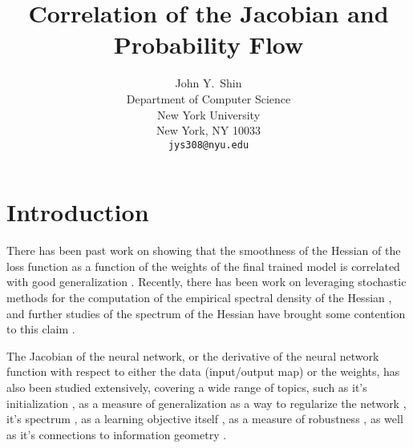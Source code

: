 \documentclass{article}
\title{Correlation of the Jacobian and Probability Flow}
\author{%
  John Y.~Shin \\
  Department of Computer Science\\
  New York University\\
  New York, NY 10033 \\
  \texttt{jys308@nyu.edu} \\
}
\begin{document}
\maketitle

\begin{abstract}
\end{abstract}

\section{Introduction}

There has been past work on showing that the smoothness of the Hessian of the loss function as a function of the weights of the final trained model is correlated with good generalization \cite{sagun2017empirical, chaudhari2019entropy}. Recently, there has been work on leveraging stochastic methods for the computation of the empirical spectral density of the Hessian \cite{ghorbani2019investigation, yao2019pyhessian}, and further studies of the spectrum of the Hessian have brought some contention to this claim \cite{goldblum2019truth, maddox2020rethinking, granziol2020flatness}. 

\cite{ghorbani2019investigation, goldblum2019truth, maddox2020rethinking, chaudhari2019entropy, sagun2017empirical, granziol2020flatness, yao2019pyhessian}

The Jacobian of the neural network, or the derivative of the neural network function with respect to either the data (input/output map) or the weights, has also been studied extensively, covering a wide range of topics, such as it's initialization \cite{pennington2017resurrecting, pennington2018emergence}, as a measure of generalization \cite{sokolic2017robust, novak2018sensitivity, jiang2018predicting, oymak2019generalization, oymak2019generalization, sanyal2019stable} as a way to regularize the network \cite{bagge2018tangent, hoffman2019robust}, it's spectrum \cite{pennington2017resurrecting, pennington2018emergence, ling2019spectrum, zhang2019one, tarnowski2019dynamical, wang2016analysis}, as a learning objective itself \cite{lorrainejacnet}, as a measure of robustness \cite{yu2018interpreting}, as well as it's connections to information geometry \cite{sokol2018information}.


\cite{sokolic2017robust, pennington2017resurrecting, novak2018sensitivity, pennington2018emergence, bagge2018tangent, ling2019spectrum, jiang2018predicting, yu2018interpreting, hoffman2019robust, oymak2019generalization, sokol2018information, lorrainejacnet, oymak2019generalization, zhang2019one, sanyal2019stable, tarnowski2019dynamical, wang2016analysis}
\end{document}

